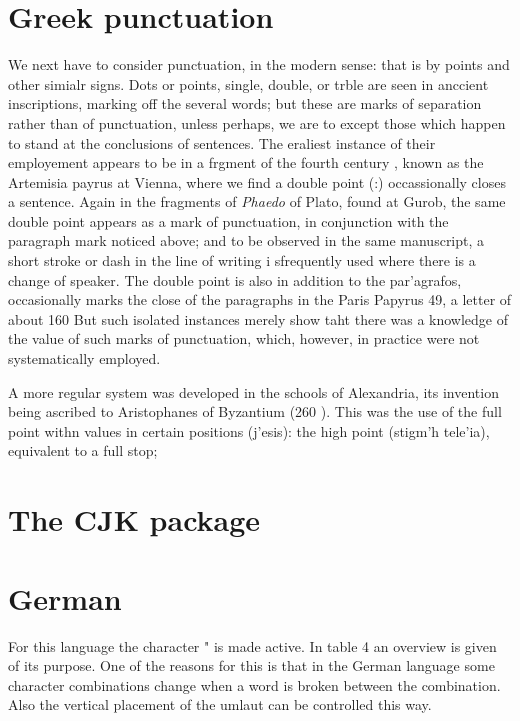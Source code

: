 \section{Greek punctuation}

We next have to consider punctuation, in the modern sense: that is by points and other simialr signs. Dots or points, single, double, or trble are seen in anccient inscriptions, marking off the several words; but these are marks of separation rather than of punctuation, unless perhaps, we are to except those which happen to stand at the conclusions of sentences. The eraliest instance of their employement appears to be in a frgment of the fourth century \BC, known as the Artemisia payrus at Vienna, where we find a double point (:) occassionally closes a sentence. Again in the fragments of \textit{Phaedo} of Plato, found at Gurob, the same double point appears as a mark of punctuation, in conjunction with the paragraph mark noticed above; and to be observed in the same manuscript, a short   stroke or dash in the line of writing i sfrequently used where there is a change of speaker. The double point is also in addition to the \textgreek{par'agrafos}, occasionally marks the close of the paragraphs in the Paris Papyrus 49, a letter of about 160 \BC But such isolated instances merely show taht there was a knowledge of the value of such marks of punctuation, which, however, in practice were not systematically employed.

A more regular system was developed in the schools of Alexandria, its invention being ascribed to Aristophanes of Byzantium (260 \BC). This was the use of the full point withn values in certain positions (\textgreek{j'esis}): the high point (\textgreek{stigm'h tele'ia}), equivalent to a full stop;

\section{The CJK package}
\begin{comment}
\begin{CJK}{Bg5}{fs}
   \Wo3 \hen3 \xi3\huan1 \chi1
   \Zhong1\guo2\fan4.
   I like to eat Chinese food
    very much.
\end{CJK}
\end{comment}

\section{German}
For this language the character " is made active. In table 4 an overview is given
of its purpose. One of the reasons for this is that in the German language some
character combinations change when a word is broken between the combination.
Also the vertical placement of the umlaut can be controlled this way. 

